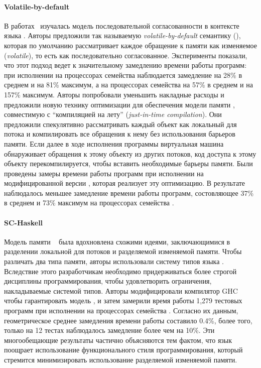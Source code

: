 \paragraph{Volatile-by-default}

В работах~\cite{Liu-al:OOPSLA17, Liu-al:PLDI19} изучалась 
модель последовательной согласованности в контексте языка \Java.
Авторы предложили так называемую \emph{volatile-by-default} семантику (\VbD),
которая по умолчанию рассматривает каждое обращение к памяти 
как изменяемое (\emph{volatile}), то есть как последовательно согласованное.  
Эксперименты показали, что этот подход ведет к значительному 
замедлению времени работы программ: 
при исполнении на процессорах семейства \Intel наблюдается 
замедление на 28\% в среднем и на 81\% максимум, 
а на процессорах семейства 
на 57\% в среднем и на 157\% максимум. 
Авторы попробовали уменьшить накладные расходы и 
предложили новую технику оптимизации для обеспечения модели памяти \SC, 
совместимую с ``компиляцией на лету'' (\emph{just-in-time compilation}).
Они предложили спекулятивно рассматривать каждый объект 
как локальный для потока и компилировать все обращения 
к нему без использования барьеров памяти. 
Если далее в ходе исполнения программы виртуальная машина
обнаруживает обращения к этому объекту из других потоков, 
код доступа к этому объекту перекомпилируется, 
чтобы вставить необходимые барьеры памяти. 
Были проведены замеры времени работы программ
при исполнении на модифицированной версии \JVM,
которая реализует эту оптимизацию. 
В результате наблюдалось меньшее замедление времени работы программ, 
состовляющее 37\% в среднем и 73\% максимум на 
процессорах семейства .

\paragraph{SC-Haskell}

Модель памяти \SCHs~\cite{Vollmer-al:PPoPP17}
была вдохновлена схожими идеями, 
заключающимися в разделении локальной для потоков 
и разделяемой изменяемой памяти. 
Чтобы различать два типа памяти, 
авторы использовали систему типов языка \Haskell.
Вследствие этого разработчикам необходимо 
придерживаться более строгой дисциплины программирования, 
чтобы удовлетворить ограничения, накладываемые системой типов. 
Авторы модифицировали компилятор GHC чтобы 
гарантировать модель \SC, и затем 
замерили время работы 1,279 тестовых программ 
при исполнении на процессорах семейства \Intel. 
Согласно их данным, геометрическое среднее 
замедления времени работы составило 0.4\%, 
более того, только на 12 тестах 
наблюдалось замедление более чем на 10\%.
Эти многообещающие результаты частично объясняются тем 
фактом, что язык \Haskell поощрает 
использование функционального стиля программирования, 
который стремится минимизировать использование 
разделяемой изменяемой памяти. 

